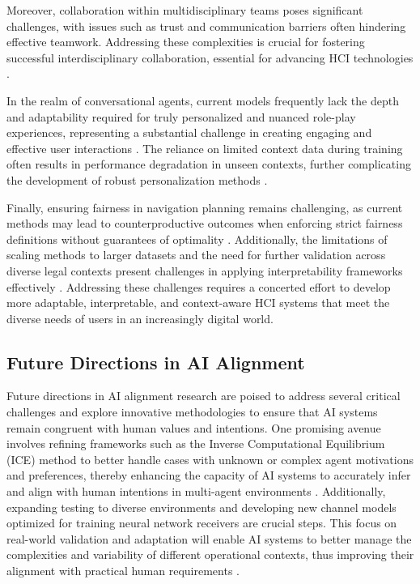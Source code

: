Moreover, collaboration within multidisciplinary teams poses significant challenges, with issues such as trust and communication barriers often hindering effective teamwork. Addressing these complexities is crucial for fostering successful interdisciplinary collaboration, essential for advancing HCI technologies \cite{korre2023takesvillagemultidisciplinaritycollaboration}.

In the realm of conversational agents, current models frequently lack the depth and adaptability required for truly personalized and nuanced role-play experiences, representing a substantial challenge in creating engaging and effective user interactions \cite{tao2024rolecraftglmadvancingpersonalizedroleplaying}. The reliance on limited context data during training often results in performance degradation in unseen contexts, further complicating the development of robust personalization methods \cite{kaur2024cropcontextwiserobuststatic}.

Finally, ensuring fairness in navigation planning remains challenging, as current methods may lead to counterproductive outcomes when enforcing strict fairness definitions without guarantees of optimality \cite{brandao2020fairnavigationplanninghumanitarian}. Additionally, the limitations of scaling methods to larger datasets and the need for further validation across diverse legal contexts present challenges in applying interpretability frameworks effectively \cite{lin2023interpretabilityframeworksimilarcase}. Addressing these challenges requires a concerted effort to develop more adaptable, interpretable, and context-aware HCI systems that meet the diverse needs of users in an increasingly digital world.


\subsection{Future Directions in AI Alignment} \label{subsec:Future Directions in AI Alignment}

Future directions in AI alignment research are poised to address several critical challenges and explore innovative methodologies to ensure that AI systems remain congruent with human values and intentions. One promising avenue involves refining frameworks such as the Inverse Computational Equilibrium (ICE) method to better handle cases with unknown or complex agent motivations and preferences, thereby enhancing the capacity of AI systems to accurately infer and align with human intentions in multi-agent environments \cite{waugh2011computationalrationalizationinverseequilibrium}. Additionally, expanding testing to diverse environments and developing new channel models optimized for training neural network receivers are crucial steps. This focus on real-world validation and adaptation will enable AI systems to better manage the complexities and variability of different operational contexts, thus improving their alignment with practical human requirements \cite{luostari2024adaptingrealityovertheairvalidation}.



